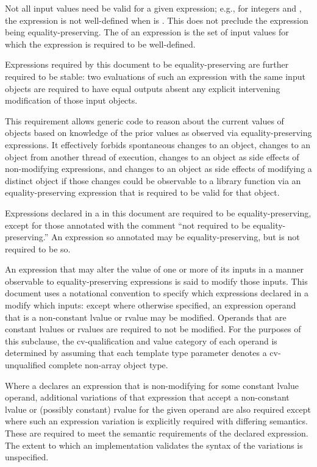 \pnum
Not all input values need be valid for a given expression; e.g., for integers
 and , the expression  is not well-defined when
 is . This does not preclude the expression 
being equality-preserving. The  of an expression is the set of
input values for which the expression is required to be well-defined.

\pnum
Expressions required by this document to be equality-preserving are further
required to be stable: two evaluations of such an expression with the same input
objects are required to have equal outputs absent any explicit intervening
modification of those input objects.
\begin{note}
This requirement allows generic code to reason about the current values of
objects based on knowledge of the prior values as observed via
equality-preserving expressions. It effectively forbids spontaneous changes to
an object, changes to an object from another thread of execution, changes to an
object as side effects of non-modifying expressions, and changes to an object as
side effects of modifying a distinct object if those changes could be observable
to a library function via an equality-preserving expression that is required to
be valid for that object.
\end{note}

\pnum
Expressions declared in a  in this document are
required to be equality-preserving, except for those annotated with the comment
``not required to be equality-preserving.'' An expression so annotated
may be equality-preserving, but is not required to be so.

\pnum
An expression that may alter the value of one or more of its inputs in a manner
observable to equality-preserving expressions is said to modify those inputs.
This document uses a notational convention to specify which expressions declared
in a  modify which inputs: except where
otherwise specified, an expression operand that is a non-constant lvalue or
rvalue may be modified. Operands that are constant lvalues or rvalues are
required to not be modified.
For the purposes of this subclause,
the cv-qualification and value category of each operand
is determined by assuming
that each template type parameter
denotes a cv-unqualified complete non-array object type.

\pnum
Where a  declares an expression that is
non-modifying for some constant lvalue operand, additional variations of that
expression that accept a non-constant lvalue or (possibly constant) rvalue for
the given operand are also required except where such an expression variation is
explicitly required with differing semantics. These
 are required to meet the semantic
requirements of the declared expression. The extent to which an implementation
validates the syntax of the variations is unspecified.

